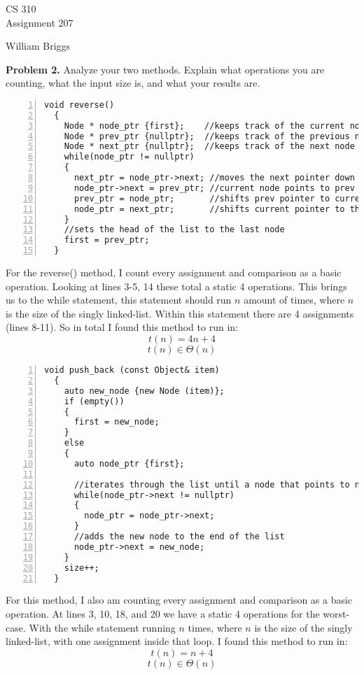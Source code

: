 \documentclass[11pt]{article}
\begin{document}
\thispagestyle{empty}

\begin{center}
{\large CS 310}\\
Assignment 207
\end{center}

\begin{flushright}
William Briggs
\end{flushright}

\textbf{Problem 2.} Analyze your two methods. Explain what operations you are counting, what the input size is, and what your results are.

\begin{Verbatim}[numbers=left,xleftmargin=5mm]
  void reverse()
  {
    Node * node_ptr {first};    //keeps track of the current node
    Node * prev_ptr {nullptr};  //keeps track of the previous node
    Node * next_ptr {nullptr};  //keeps track of the next node
    while(node_ptr != nullptr)
    {
      next_ptr = node_ptr->next; //moves the next pointer down the list
      node_ptr->next = prev_ptr; //current node points to prev node
      prev_ptr = node_ptr;       //shifts prev pointer to current pointer
      node_ptr = next_ptr;       //shifts current pointer to the next pointer
    }
    //sets the head of the list to the last node
    first = prev_ptr;
  }
\end{Verbatim}

For the reverse() method, I count every assignment and comparison as a basic operation. Looking at lines 3-5, 14 these total a static 4 operations. This brings us to the while statement, this statement should run $n$ amount of times, where $n$ is the size of the singly linked-list. Within this statement there are 4 assignments (lines 8-11). So in total I found this method to run in:
\[
t(n) = 4n + 4
\]
\[
t(n) \in \Theta(n)
\]
\begin{Verbatim}[numbers=left,xleftmargin=5mm]
  void push_back (const Object& item)
  {
    auto new_node {new Node (item)};
    if (empty())
    {
      first = new_node;
    }
    else
    {
      auto node_ptr {first};

      //iterates through the list until a node that points to null is found
      while(node_ptr->next != nullptr)
      {
        node_ptr = node_ptr->next;
      }
      //adds the new node to the end of the list
      node_ptr->next = new_node;
    }
    size++;
  }
\end{Verbatim}

For this method, I also am counting every assignment and comparison as a basic operation. At lines 3, 10, 18, and 20 we have a static 4 operations for the worst-case. With the while statement running $n$ times, where $n$ is the size of the singly linked-list, with one assignment inside that loop. I found this method to run in:
\[
t(n) = n + 4
\]
\[
t(n) \in \Theta(n)
\]
\end{document}
